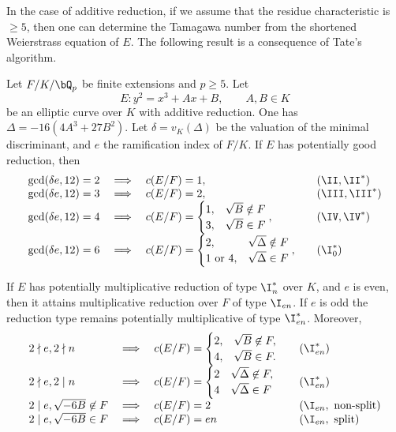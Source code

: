 In the case of additive reduction, if we assume that the residue characteristic is $\geq 5$, then one can determine the Tamagawa number from the shortened Weierstrass equation of $E$. The following result is a consequence of Tate's algorithm.

\begin{lemma}\label{lem_add_tam}\label{tamagawa-num}\cite[Lemma 3.22]{reg-const}
    Let $F /K / \bQ_p$ be finite extensions and $p \geq 5$. Let
    $$E \colon  y^2 = x^3 + Ax + B, \qquad A, B \in K$$
    be an elliptic curve over $K$ with additive reduction. One has $\Delta = -16(4A^3 + 27 B^2)$. Let $\delta=v_K(\Delta)$ be the valuation of the minimal discriminant, and $e$ the ramification index of $F/K$.
    If $E$ has potentially good reduction, then 
        \[
        \begin{array}{l l l l}
            \gcd(\delta e, 12) = 2 & \implies & c(E / F) = 1, & \quad (\II, \II^*) \\
            \gcd(\delta e, 12) = 3 & \implies & c(E / F) = 2, & \quad (\III, \III^*) \\
            \gcd(\delta e, 12) = 4 & \implies & c(E / F) = \begin{cases} 1, & \sqrt{B} \notin F
                                \\ 3, & \sqrt{B} \in F \end{cases}, & \quad (\IV, \IV^*) \\
            \gcd(\delta e, 12) = 6 & \implies & c(E / F) = \begin{cases} 2, & \sqrt{\Delta} \notin F
                \\ 1 \ \text{or} \ 4, & \sqrt{\Delta} \in F \end{cases}, & \quad (\I_0^*) 
        \end{array}
        \]
     
        If $E$ has potentially multiplicative reduction of type $\I_n^*$ over $K$,
        and $e$ is even, then it attains multiplicative reduction over $F$ of type $\I_{en}$. If $e$ is odd the reduction type remains potentially multiplicative of type $\I_{en}^*$. Moreover, 
        \[
            \begin{array}{l l l l}
                2 \nmid e, 2 \nmid n & \implies & c(E / F) = \begin{cases} 2, & \sqrt{B} \not\in F, \\ 4, & \sqrt{B} \in F. \end{cases} & \quad (\I_{en}^*) \\
                2 \nmid e, 2 \mid n & \implies & c(E / F) = \begin{cases} 2 & \sqrt{\Delta} \not\in F, \\ 4 & \sqrt{\Delta} \in F \end{cases} & \quad ({\I_{en}^*}) \\
                2 \mid e, \sqrt{-6 B} \not\in F & \implies & c(E / F ) = 2 & \quad (\I_{en}, \text{ non-split}) \\
                2 \mid e, \sqrt{-6 B} \in F & \implies & c(E / F) = en & \quad (\I_{en}, \text{ split})
                \end{array} 
            \]
\end{lemma}
